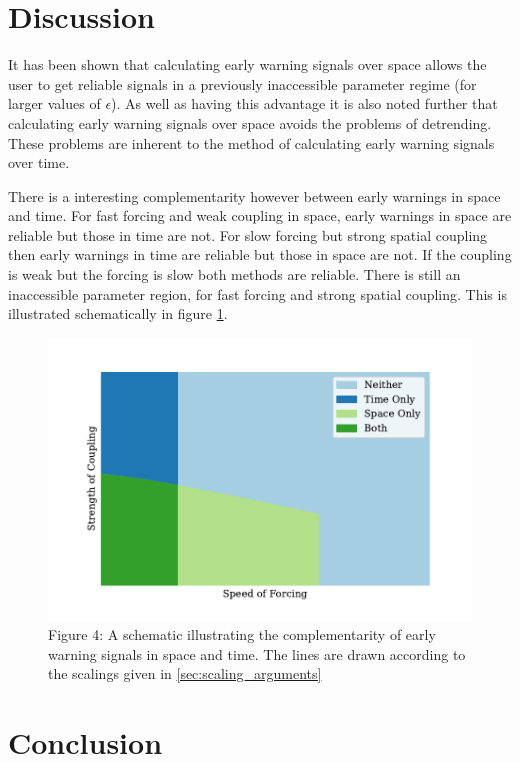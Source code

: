 \section{Discussion}
It has been shown that calculating early warning signals over space allows the user to get reliable
signals in a previously inaccessible parameter regime (for larger values of $\epsilon$).  As well
as having this advantage it is also noted further that calculating early warning signals over space avoids 
the problems of detrending. These problems are inherent to the method of calculating early warning signals over
time.

There is a interesting complementarity however between early warnings in space and time. For fast forcing
and weak coupling in space, early warnings in space are reliable but those in time are not. For slow forcing
but strong spatial coupling then early warnings in time are reliable but those in space are not. If the
coupling is weak but the forcing is slow both methods are reliable. There is still an inaccessible parameter
region, for fast forcing and strong spatial coupling. This is illustrated schematically in figure
\cref{fig:idealised_plot}.
\begin{figure}
  \centering
  \includegraphics[width=\textwidth,keepaspectratio]{idealised_plot}
  \caption[A schematic showing the complementarity of spatial and temporal early warning signals]{Figure 4: A schematic illustrating the complementarity of early warning signals in space and time.
    The lines are drawn according to the scalings given in \cref{sec:scaling_arguments}}
  \label{fig:idealised_plot}
\end{figure}

\section{Conclusion}

